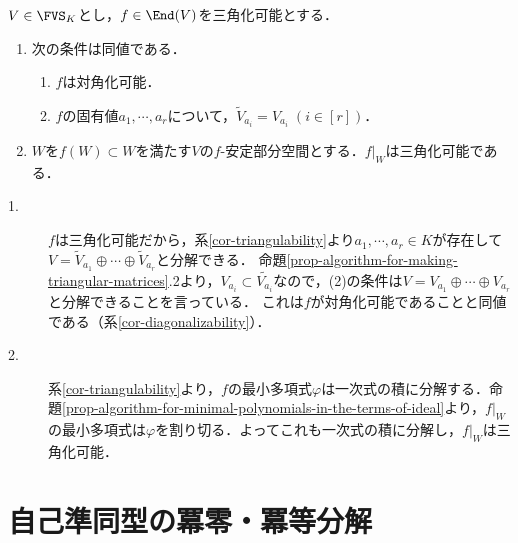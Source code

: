 \documentclass[uplatex, dvipdfmx]{jsreport}
\begin{document}
\begin{corollary}[三角化可能性の遺伝]
    $V\in\FVS_K$とし，$f\in\End(V)$を三角化可能とする．
    \begin{enumerate}
        \item 次の条件は同値である．
        \begin{enumerate}[(1)]
            \item $f$は対角化可能．
            \item $f$の固有値$a_1,\cdots,a_r$について，$\widetilde{V}_{a_i}=V_{a_i}\;(i\in[r])$．
        \end{enumerate}
        \item $W$を$f(W)\subset W$を満たす$V$の$f$-安定部分空間とする．$f|_W$は三角化可能である．
    \end{enumerate}
\end{corollary}
\begin{Proof}\mbox{}
    \begin{description}
        \item[1.] $f$は三角化可能だから，系\ref{cor-triangulability}より$a_1,\cdots,a_r\in K$が存在して$V=\tilde{V}_{a_1}\oplus\cdots\oplus \tilde{V}_{a_r}$と分解できる．
        命題\ref{prop-algorithm-for-making-triangular-matrices}.2より，$V_{a_i}\subset\tilde{V_{a_i}}$なので，(2)の条件は$V=V_{a_1}\oplus\cdots\oplus V_{a_r}$と分解できることを言っている．
        これは$f$が対角化可能であることと同値である（系\ref{cor-diagonalizability}）．
        \item[2.] 系\ref{cor-triangulability}より，$f$の最小多項式$\varphi$は一次式の積に分解する．命題\ref{prop-algorithm-for-minimal-polynomials-in-the-terms-of-ideal}より，$f|_W$の最小多項式は$\varphi$を割り切る．よってこれも一次式の積に分解し，$f|_W$は三角化可能．
    \end{description}
\end{Proof}

\section{自己準同型の冪零・冪等分解}
\end{document}
